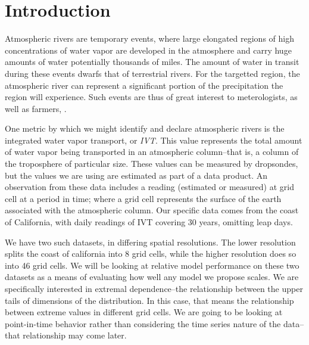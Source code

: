 
\section{Introduction}
Atmospheric rivers are temporary events, where large elongated regions of high concentrations of
  water vapor are developed in the atmosphere and carry huge amounts of water potentially thousands
  of miles.  The amount of water in transit during these events dwarfs that of terrestrial rivers.
  For the targetted region, the atmospheric river can represent a significant portion of the
  precipitation the region will experience.  Such events are thus of great interest to meterologists,
  as well as farmers, .

One metric by which we might identify and declare atmospheric rivers is the integrated water vapor
  transport, or \emph{IVT}.  This value represents the total amount of water vapor being transported
  in an atmospheric column--that is, a column of the troposphere of particular size. These values
  can be measured by dropsondes, but the values we are using are estimated as part of a data
  product.  An observation from these data includes a reading (estimated
  or measured) at grid cell at a period in time; where a grid cell represents the surface of the
  earth associated with the atmospheric column.  Our specific data comes from the coast of California,
  with daily readings of IVT covering 30 years, omitting leap days.

We have two such datasets, in differing spatial resolutions.  The lower resolution splits the coast
  of california into 8 grid cells, while the higher resolution does so into 46 grid cells.
  We will be looking at relative model performance on these two datasets as a means of evaluating
  how well any model we propose scales.  We are specifically interested in extremal dependence--the
  relationship between the upper tails of dimensions of the distribution.  In this case, that means
  the relationship between extreme values in different grid cells.  We are going to be looking at
  point-in-time behavior rather than considering the time series nature of the data--that
  relationship may come later.

